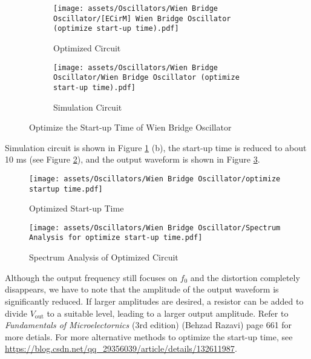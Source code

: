 \documentclass[D:/a_RemoteRepo/GH.LatexNotes/.demo/Analog_Circuits_Handbook.tex]{subfiles}
\begin{document}
\begin{figure}[H]\centering
\begin{subfigure}[b]{0.5\columnwidth}\centering
    \texttt{[image: assets/Oscillators/Wien Bridge Oscillator/[ECirM] Wien Bridge Oscillator (optimize start-up time).pdf]}
    \caption{Optimized Circuit}
\end{subfigure}\hfill
\begin{subfigure}[b]{0.5\columnwidth}\centering
    \texttt{[image: assets/Oscillators/Wien Bridge Oscillator/Wien Bridge Oscillator (optimize start-up time).pdf]}
    \caption{Simulation Circuit}
\end{subfigure}
\caption{Optimize the Start-up Time of Wien Bridge Oscillator}
\label{fig: Optimize the Start-up Time of Wien Bridge Oscillator}
\end{figure}


Simulation circuit is shown in Figure \ref{fig: Optimize the Start-up Time of Wien Bridge Oscillator} (b), 
the start-up time is reduced to about 10 ms (see Figure \ref{fig: Optimized Start-up Time}), and the output waveform is shown in Figure \ref{fig: Spectrum Analysis of Optimized Circuit}.

\begin{figure}[H]\centering
    \texttt{[image: assets/Oscillators/Wien Bridge Oscillator/optimize startup time.pdf]}
    \caption{Optimized Start-up Time}
    \label{fig: Optimized Start-up Time}
\end{figure}

\begin{figure}[H]\centering
    \texttt{[image: assets/Oscillators/Wien Bridge Oscillator/Spectrum Analysis for optimize start-up time.pdf]}
    \caption{Spectrum Analysis of Optimized Circuit}
    \label{fig: Spectrum Analysis of Optimized Circuit}
\end{figure}


Although the output frequency still focuses on $f_0$ and the distortion completely disappears, we have to note that the amplitude of the output waveform is significantly reduced. 
If larger amplitudes are desired, a resistor can be added to divide $V_{\text{out}}$ to a suitable level, leading to a larger output amplitude. Refer to \textit{Fundamentals of Microelectornics} (3rd edition) (Behzad Razavi) page 661 for more detials.
For more alternative methods to optimize the start-up time, see \url{https://blog.csdn.net/qq_29356039/article/details/132611987}.
\end{document}
